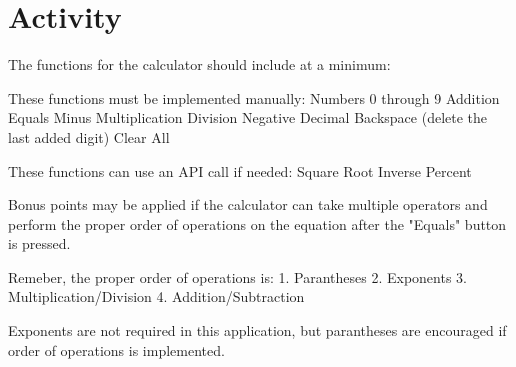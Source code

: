 \section{Activity}

The functions for the calculator should include at a minimum:

These functions must be implemented manually:
Numbers 0 through 9
Addition
Equals
Minus
Multiplication
Division
Negative
Decimal
Backspace (delete the last added digit)
Clear All

These functions can use an API call if needed:
Square Root
Inverse
Percent

Bonus points may be applied if the calculator can take multiple operators and perform the proper order of operations on the equation after the "Equals" button is pressed.

Remeber, the proper order of operations is:
1. Parantheses
2. Exponents
3. Multiplication/Division
4. Addition/Subtraction

Exponents are not required in this application, but parantheses are encouraged if order of operations is implemented.
